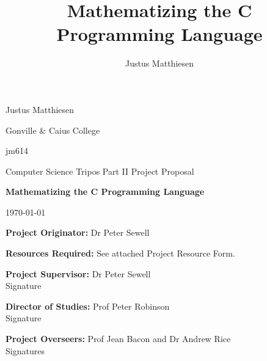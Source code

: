 \documentclass[12pt,a4paper,titlepage]{article}
\title{Mathematizing the C Programming Language}
\author{Justus Matthiesen}
\date{}
\begin{document}
\begin{titlepage}
\begin{flushright}
Justus Matthiesen

Gonville \& Caius College

jm614
\end{flushright}

\vspace{2\baselineskip}

\begin{center}
Computer Science Tripos Part II Project Proposal

\vspace{1.5\baselineskip}

\Large{\bfseries Mathematizing the C Programming Language}

\vspace{1\baselineskip}

\normalsize\today
\end{center}

\vspace{6\baselineskip}

\begin{flushleft}
{\bfseries Project Originator:} Dr Peter Sewell

\vspace{0.5\baselineskip}
{\bfseries Resources Required:} See attached Project Resource Form.

\vspace{2\baselineskip}

{\bfseries Project Supervisor:} Dr Peter Sewell \\
\vspace{0.5\baselineskip}
Signature

\vspace{2\baselineskip}

{\bfseries Director of Studies:} Prof Peter Robinson \\
\vspace{0.5\baselineskip}
Signature

\vspace{2\baselineskip}

{\bf Project Overseers:} Prof Jean Bacon and  Dr Andrew Rice\\
\vspace{0.5\baselineskip}
Signatures
\end{flushleft}
\end{titlepage}
\end{document}

